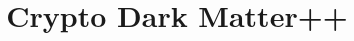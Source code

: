 \documentclass[11pt]{article}
\begin{document}
\title{Crypto Dark Matter++}
\author{}
\date{}

\maketitle


\end{document}
